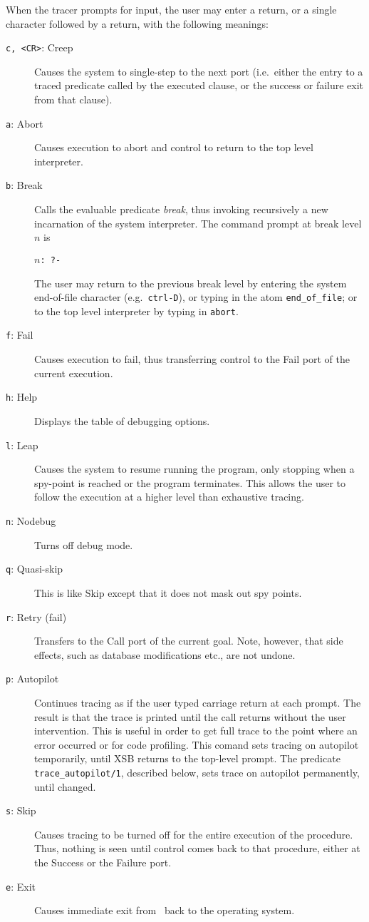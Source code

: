 When the tracer prompts for input, the user may enter a return, or a single
character followed by a return, with the following meanings:
\begin{description}
\item[{\tt c, <CR>}: Creep] Causes the system to single-step to the next
  port (i.e.\ either the entry to a traced predicate called by the executed
  clause, or the success or failure exit from that clause).
\item[{\tt a}: Abort] Causes execution to abort
  and control to return to the top level interpreter.
\item[{\tt b}: Break] Calls the evaluable predicate {\em break}, thus
  invoking recursively a new incarnation of the system interpreter.  The
  command prompt at break level $n$ is
  \begin{center}
    {\tt $n$: \tt ?-}
  \end{center}
  The user may return to the previous break level by entering the system
  end-of-file character (e.g.\ {\tt ctrl-D}), or typing in the atom 
  {\tt end\_of\_file}; or to the top level interpreter by typing in
  {\tt abort}.
\item[{\tt f}: Fail] Causes execution to fail, thus transferring control to
  the Fail port of the current execution.
\item[{\tt h}: Help] Displays the table of debugging options.
\item[{\tt l}: Leap] Causes the system to resume running the program, only
  stopping when a spy-point is reached or the program terminates.  This
  allows the user to follow the execution at a higher level than exhaustive
  tracing.
\item[{\tt n}: Nodebug] Turns off debug mode.
\item[{\tt q}: Quasi-skip] This is like Skip except that it does not mask
  out spy points.
\item[{\tt r}: Retry (fail)] Transfers to the Call port of the current
  goal.  Note, however, that side effects, such as database modifications
  etc., are not undone.
\item[{\tt p}: Autopilot] Continues tracing as if the user typed carriage
  return at each prompt. The result is that the trace is printed until the
  call returns without the user intervention. This is useful in order to
  get full trace to the point where an error occurred or for code
  profiling.  This comand sets tracing on autopilot temporarily, until XSB
  returns to the top-level prompt. The predicate \verb|trace_autopilot/1|,
  described below, sets trace on autopilot permanently, until changed.
\item[{\tt s}: Skip] Causes tracing to be turned off for the entire
  execution of the procedure.  Thus, nothing is seen until control comes
  back to that procedure, either at the Success or the Failure port.
\item[{\tt e}: Exit] Causes immediate exit from \ourprolog\ back to the
  operating system.
\end{description}

